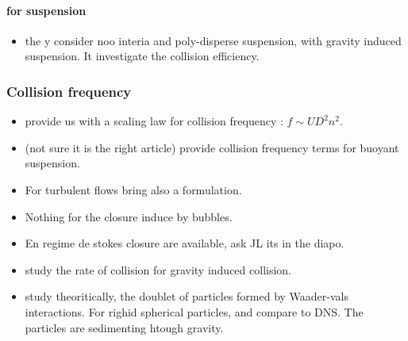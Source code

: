 \paragraph*{for suspension}
\begin{itemize}
    \item \cite{zinchenko1994gravity} the y consider noo interia and poly-disperse suspension, with gravity induced suspension.
    It investigate the collision efficiency. 
\end{itemize}

\subsubsection{Collision frequency}

\begin{itemize}
    \item \citet{chesters1991modelling} provide us with a scaling law for collision frequency : $f\sim U D^2n^2$.
    \item \citet{davis1985sedimentation} (not sure it is the right article) provide collision frequency terms for buoyant suspension. 
    \item For turbulent flows  \citet{saffman1956collision} bring also a formulation.
    \item Nothing for the closure induce by bubbles.
    \item En regime de stokes closure are available, ask JL its in the diapo. 
    \item \citet{zhang1991rate} study the rate of collision for gravity induced collision.
    \item \citet{davis1984rate} study theoritically, the doublet of particles formed by Waader-vals interactions.
    For righid spherical particles, and compare to DNS. 
    The particles are sedimenting htough gravity. 
\end{itemize}
